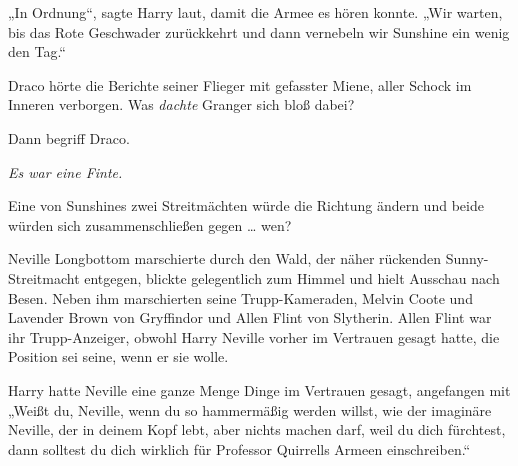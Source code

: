 „In Ordnung“, sagte Harry laut, damit die Armee es hören konnte.
„Wir warten, bis das Rote Geschwader zurückkehrt und dann vernebeln wir Sunshine ein wenig den Tag.“

\later

Draco hörte die Berichte seiner Flieger mit gefasster Miene, aller Schock im Inneren verborgen. Was \emph{dachte} Granger sich bloß dabei?

Dann begriff Draco.

\emph{Es war eine Finte.}

Eine von Sunshines zwei Streitmächten würde die Richtung ändern und beide würden sich zusammenschließen gegen … wen?

\later

Neville Longbottom marschierte durch den Wald, der näher rückenden Sunny-Streitmacht entgegen, blickte gelegentlich zum Himmel und hielt Ausschau nach Besen. Neben ihm marschierten seine Trupp-Kameraden, Melvin Coote und Lavender Brown von Gryffindor und Allen Flint von Slytherin. Allen Flint war ihr Trupp-Anzeiger, obwohl Harry Neville vorher im Vertrauen gesagt hatte, die Position sei seine, wenn er sie wolle.

Harry hatte Neville eine ganze Menge Dinge im Vertrauen gesagt, angefangen mit
„Weißt du, Neville, wenn du so hammermäßig werden willst, wie der imaginäre Neville, der in deinem Kopf lebt, aber nichts machen darf, weil du dich fürchtest, dann solltest du dich wirklich für Professor Quirrells Armeen einschreiben.“


